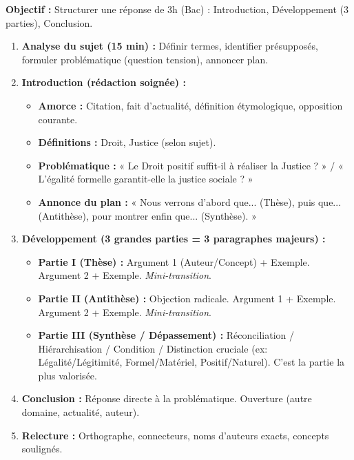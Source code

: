 \documentclass[11pt]{article}
\newcommand{\cle}[1]{{\popxbold\color{popdark}#1}}
\begin{document}
\begin{methode}
    \textbf{Objectif :} Structurer une réponse de 3h (Bac) : Introduction, Développement (3 parties), Conclusion.
    \begin{enumerate}
        \item \textbf{Analyse du sujet (15 min) :} Définir termes, identifier présupposés, formuler \cle{problématique} (question tension), annoncer \cle{plan}.
        \item \textbf{Introduction (rédaction soignée) :}
            \begin{itemize}
                \item \textbf{Amorce :} Citation, fait d'actualité, définition étymologique, opposition courante.
                \item \textbf{Définitions :} Droit, Justice (selon sujet).
                \item \textbf{Problématique :} « Le Droit positif suffit-il à réaliser la Justice ? » / « L'égalité formelle garantit-elle la justice sociale ? »
                \item \textbf{Annonce du plan :} « Nous verrons d'abord que... (Thèse), puis que... (Antithèse), pour montrer enfin que... (Synthèse). »
            \end{itemize}
        \item \textbf{Développement (3 grandes parties = 3 paragraphes majeurs) :}
            \begin{itemize}
                \item \textbf{Partie I (Thèse) :} Argument 1 (Auteur/Concept) + Exemple. Argument 2 + Exemple. \textit{Mini-transition}.
                \item \textbf{Partie II (Antithèse) :} Objection radicale. Argument 1 + Exemple. Argument 2 + Exemple. \textit{Mini-transition}.
                \item \textbf{Partie III (Synthèse / Dépassement) :} Réconciliation / Hiérarchisation / Condition / Distinction cruciale (ex: Légalité/Légitimité, Formel/Matériel, Positif/Naturel). C'est la partie la plus valorisée.
            \end{itemize}
        \item \textbf{Conclusion :} Réponse directe à la problématique. Ouverture (autre domaine, actualité, auteur).
        \item \textbf{Relecture :} Orthographe, connecteurs, noms d'auteurs exacts, concepts soulignés.
    \end{enumerate}
\end{methode}
\end{document}

